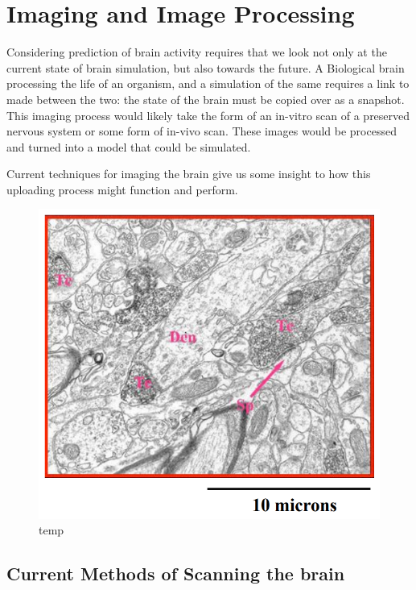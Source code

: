 \section{Imaging and Image Processing}

Considering prediction of brain activity requires that we look not only at the
current state of brain simulation, but also towards the future. A Biological
brain processing the life of an organism, and a simulation of the same requires
a link to made between the two: the state of the brain must be copied over as a
snapshot. This imaging process would likely take the form of an in-vitro scan of
a preserved nervous system or some form of in-vivo scan. These images would be
processed and turned into a model that could be simulated.

Current techniques for imaging the brain give us some insight to how this
uploading process might function and perform.

\begin{figure}[h]
    \centering
    \includegraphics{figures/graphs/scaleexample.png}
    {temp}
    \label{scaleexample}
\end{figure}
\vspace{1ex}

\subsection{Current Methods of Scanning the brain}

